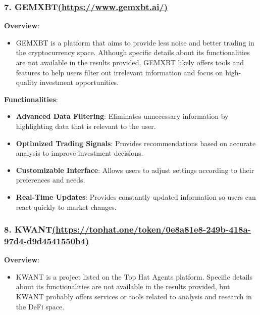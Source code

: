 \documentclass[
]{article}
\providecommand{\tightlist}{%
  \setlength{\itemsep}{0pt}\setlength{\parskip}{0pt}}
\begin{document}
\hypertarget{gemxbthttpswww.gemxbt.ai}{%
\subsubsection{\texorpdfstring{\textbf{7.
GEMXBT}\href{https://www.gemxbt.ai/}{(https://www.gemxbt.ai/)}}{7. GEMXBT(https://www.gemxbt.ai/)}}\label{gemxbthttpswww.gemxbt.ai}}

\textbf{Overview}:

\begin{itemize}
\tightlist
\item
  GEMXBT is a platform that aims to provide less noise and better
  trading in the cryptocurrency space. Although specific details about
  its functionalities are not available in the results provided, GEMXBT
  likely offers tools and features to help users filter out irrelevant
  information and focus on high-quality investment opportunities.
\end{itemize}

\textbf{Functionalities}:

\begin{itemize}
\tightlist
\item
  \textbf{Advanced Data Filtering}: Eliminates unnecessary information
  by highlighting data that is relevant to the user.
\item
  \textbf{Optimized Trading Signals}: Provides recommendations based on
  accurate analysis to improve investment decisions.
\item
  \textbf{Customizable Interface}: Allows users to adjust settings
  according to their preferences and needs.
\item
  \textbf{Real-Time Updates}: Provides constantly updated information so
  users can react quickly to market changes.
\end{itemize}

\hypertarget{kwanthttpstophat.onetoken0e8a81e8-249b-418a-97d4-d9d4541550b4}{%
\subsubsection{\texorpdfstring{\textbf{8.
KWANT}\href{https://tophat.one/token/0e8a81e8-249b-418a-97d4-d9d4541550b4}{(https://tophat.one/token/0e8a81e8-249b-418a-97d4-d9d4541550b4)}}{8. KWANT(https://tophat.one/token/0e8a81e8-249b-418a-97d4-d9d4541550b4)}}\label{kwanthttpstophat.onetoken0e8a81e8-249b-418a-97d4-d9d4541550b4}}

\textbf{Overview}:

\begin{itemize}
\tightlist
\item
  KWANT is a project listed on the Top Hat Agents platform. Specific
  details about its functionalities are not available in the results
  provided, but KWANT probably offers services or tools related to
  analysis and research in the DeFi space.
\end{itemize}
\end{document}
